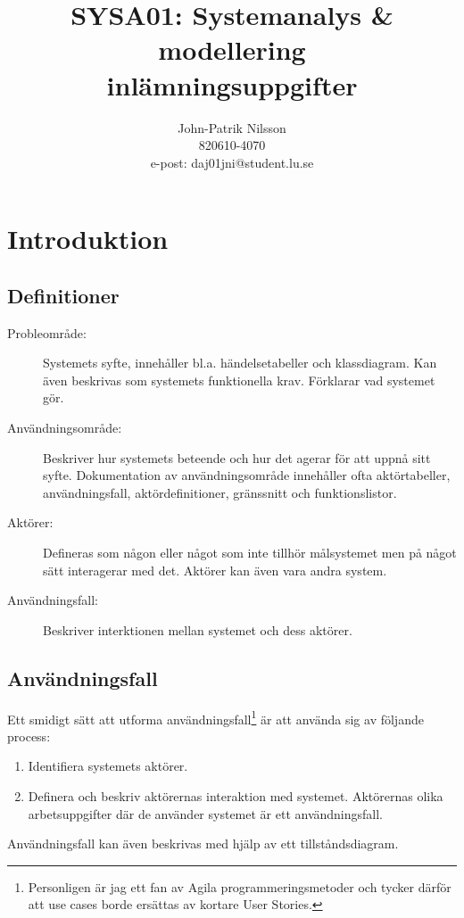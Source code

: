 \documentclass[a4paper,12pt]{article}
\title{\textsf{\textbf{SYSA01: Systemanalys \& modellering \\
    inlämningsuppgifter}}}
\author{John-Patrik Nilsson \\
    820610-4070 \\
    e-post: daj01jni@student.lu.se}
\begin{document}
\maketitle
\thispagestyle{empty}

\newpage
\tableofcontents

\newpage
\section{\textsf{Introduktion}}
\subsection{\textsf{Definitioner}}
\begin{description}
\item[Probleområde:] Systemets syfte, innehåller bl.a. händelsetabeller och klassdiagram. Kan även beskrivas som systemets funktionella krav. Förklarar vad systemet gör.
\item[Användningsområde:] Beskriver hur systemets beteende och hur det agerar för att uppnå sitt syfte. Dokumentation av användningsområde innehåller ofta aktörtabeller, användningsfall, aktördefinitioner, gränssnitt och funktionslistor.
\item[Aktörer:] Defineras som någon eller något som inte tillhör målsystemet men på något sätt interagerar med det. Aktörer kan även vara andra system.
\item[Användningsfall:] Beskriver interktionen mellan systemet och dess aktörer.
\end{description}

\subsection{\textsf{Användningsfall}}
Ett smidigt sätt att utforma användningsfall\footnote{Personligen är jag ett fan av Agila programmeringsmetoder och tycker därför att use cases borde ersättas av kortare User Stories.} är att använda sig av följande process:

\begin{enumerate}
\item Identifiera systemets aktörer.
\item Definera och beskriv aktörernas interaktion med systemet. Aktörernas olika arbetsuppgifter där de använder systemet är ett användningsfall.
\end{enumerate}

Användningsfall kan även beskrivas med hjälp av ett tillståndsdiagram.
\end{document}
